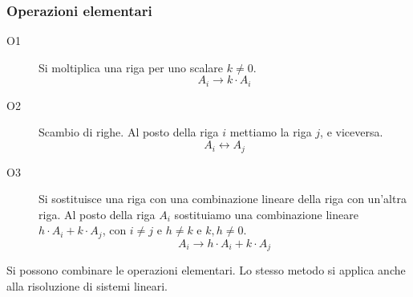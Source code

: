 \subsubsection{Operazioni elementari}
\begin{description}
    \item[O1\label{itm:gauss_op_1}] Si moltiplica una riga per uno scalare $k \neq 0$.
    \[
    A_i \to k \cdot A_i
    \]
    \item[O2\label{itm:gauss_op_2}] Scambio di righe. Al posto della riga $i$ mettiamo la riga $j$, e viceversa.
    \[
    A_i \leftrightarrow A_j
    \]
    \item[O3\label{itm:gauss_op_3}] Si sostituisce una riga con una combinazione lineare della riga con un'altra riga. Al posto della riga $A_i$ sostituiamo una combinazione lineare $h \cdot A_i + k \cdot A_j$, con $i \neq j$ e $h \neq k$ e $k, h \neq 0$.
    \[
    A_i \to h \cdot A_i + k \cdot A_j
    \]
\end{description}
Si possono combinare le operazioni elementari. Lo stesso metodo si applica anche alla risoluzione di sistemi lineari.
